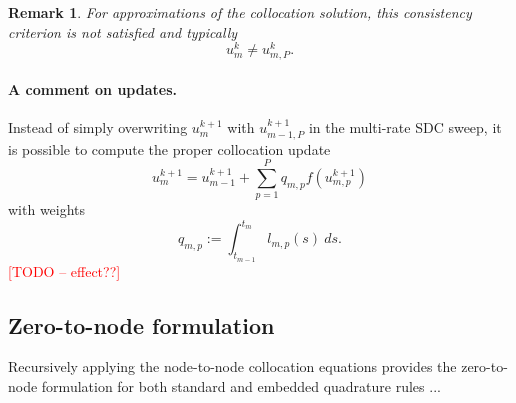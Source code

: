 \documentclass{article}
\newtheorem{remark}{Remark}
\newcommand{\todo}[1]{\textcolor{red}{[TODO -- #1]}}
\begin{document}
%
%
\begin{remark}
For approximations of the collocation solution, this consistency criterion is not satisfied and typically
\begin{equation}
	u_{m}^{k} \neq u_{m,P}^{k}.
\end{equation}
\end{remark}

\paragraph{A comment on updates.}
Instead of simply overwriting $u^{k+1}_{m}$ with $u^{k+1}_{m-1,P}$ in the multi-rate SDC sweep, it is possible to compute the proper collocation update
\begin{equation}
	u^{k+1}_{m} = u^{k+1}_{m-1} + \sum_{p=1}^{P} q_{m, p} f(u^{k+1}_{m,p})
\end{equation}
with weights
\begin{equation}
	q_{m,p} := \int_{t_{m-1}}^{t_{m}} l_{m,p}(s)~ds.
\end{equation}
\todo{effect??}

\subsection*{Zero-to-node formulation}
Recursively applying the node-to-node collocation equations provides the zero-to-node formulation for both standard and embedded quadrature rules
...
\end{document}

